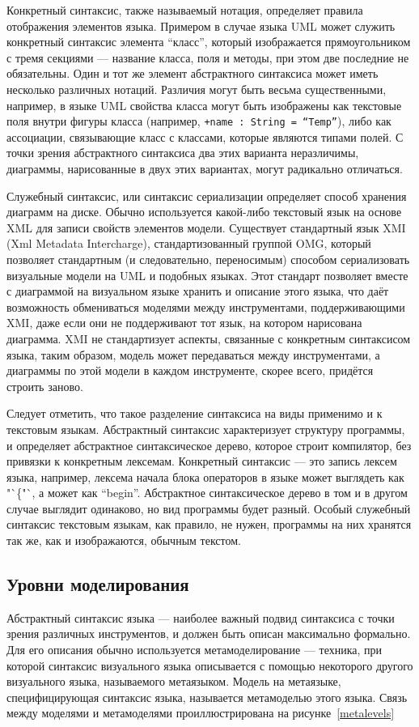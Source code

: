 Конкретный синтаксис, также называемый нотация, определяет правила отображения 
элементов языка. Примером в случае языка UML может служить конкретный синтаксис 
элемента "`класс"', который изображается прямоугольником с тремя секциями --- 
название класса, поля и методы, при этом две последние не обязательны. Один и 
тот же элемент абстрактного синтаксиса может иметь несколько различных нотаций. 
Различия могут быть весьма существенными, например, в языке UML свойства класса 
могут быть изображены как текстовые поля внутри фигуры класса (например, 
\verb|+name : String = “Temp”|), либо как ассоциации, связывающие класс с 
классами, которые являются типами полей. С точки зрения абстрактного синтаксиса 
два этих варианта неразличимы, диаграммы, нарисованные в двух этих вариантах, 
могут радикально отличаться.

Служебный синтаксис, или синтаксис сериализации определяет способ хранения 
диаграмм на диске. Обычно используется какой-либо текстовый язык на основе XML 
для записи свойств элементов модели. Существует стандартный язык XMI 
(Xml Metadata Intercharge), стандартизованный группой OMG, который позволяет 
стандартным (и следовательно, переносимым) способом сериализовать визуальные 
модели на UML и подобных языках. Этот стандарт позволяет вместе с диаграммой 
на визуальном языке хранить и описание этого языка, что даёт возможность 
обмениваться моделями между инструментами, поддерживающими XMI, даже если они 
не поддерживают тот язык, на котором нарисована диаграмма. XMI не стандартизует 
аспекты, связанные с конкретным синтаксисом языка, таким образом, модель может 
передаваться между инструментами, а диаграммы по этой модели в каждом 
инструменте, скорее всего, придётся строить заново.

Следует отметить, что такое разделение синтаксиса на виды применимо и к 
текстовым языкам. Абстрактный синтаксис характеризует структуру программы, и 
определяет абстрактное синтаксическое дерево, которое строит компилятор, 
без привязки к конкретным лексемам. Конкретный синтаксис --- это запись лексем 
языка, например, лексема начала блока операторов в языке может выглядеть как 
"`\{"`, а может как "`begin"'. Абстрактное синтаксическое дерево в том и в 
другом случае выглядит одинаково, но вид программы будет разный. Особый 
служебный синтаксис текстовым языкам, как правило, не нужен, программы на них 
хранятся так же, как и изображаются, обычным текстом.

\subsection{Уровни моделирования}
Абстрактный синтаксис языка --- наиболее важный подвид синтаксиса с точки зрения 
различных инструментов, и должен быть описан максимально формально. Для его 
описания обычно используется метамоделирование --- техника, при которой 
синтаксис визуального языка описывается с помощью некоторого другого 
визуального языка, называемого метаязыком. Модель на метаязыке, специфицирующая 
синтаксис языка, называется метамоделью этого языка. Связь между моделями и 
метамоделями проиллюстрирована на рисунке~\ref{metalevels}

